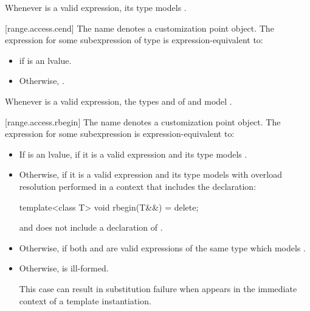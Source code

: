 \pnum
\begin{note}
Whenever  is a valid expression, its type models
.
\end{note}

[range.access.cend]{}
\pnum
The name  denotes a customization point
object. The expression
 for some subexpression  of type 
is expression-equivalent to:

\begin{itemize}
\item {} if  is an lvalue.
\item Otherwise, .
\end{itemize}

\pnum
\begin{note}
Whenever  is a valid expression,
the types  and  of
 and 
model .
\end{note}

[range.access.rbegin]{}
\pnum
The name  denotes a customization point
object. The expression
 for some subexpression  is
expression-equivalent to:

\begin{itemize}
\item
  If  is an lvalue, 
  if it is a valid expression and its type  models .

\item
  Otherwise,  if it is a valid
  expression and its type  models  with overload
  resolution performed in a context that includes the declaration:
  \begin{codeblock}
  template<class T> void rbegin(T&&) = delete;
  \end{codeblock}

  and does not include a declaration of .

\item
  Otherwise,  if both
   and  are valid
  expressions of the same type  which models
  .

\item
  Otherwise,  is ill-formed.
  \begin{note}
  This case can result in substitution failure when 
  appears in the immediate context of a template instantiation.
  \end{note}
\end{itemize}

